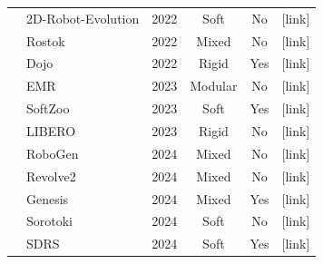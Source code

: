 \documentclass[11pt]{article}
\begin{document}
\begin{table}[htbp]
{\begin{tabular}{@{}l|l|c|c|c|c@{}}
      & 2D-Robot-Evolution & 2022 & Soft & No & {[link]} \\
      & Rostok & 2022 & Mixed & No & {[link]} \\
      & Dojo & 2022 & Rigid & Yes & {[link]} \\
      & EMR & 2023 & Modular & No & {[link]} \\
      & SoftZoo & 2023 & Soft & Yes & {[link]} \\
      & LIBERO & 2023 & Rigid & No & {[link]} \\
      & RoboGen & 2024 & Mixed & No & {[link]} \\
      & Revolve2 & 2024 & Mixed & No & {[link]} \\
      & Genesis & 2024 & Mixed & Yes & {[link]} \\
      & Sorotoki & 2024 & Soft& No & {[link]} \\
      & SDRS & 2024 & Soft & Yes & {[link]} \\
    \bottomrule
  \end{tabular}
}
\end{table}
\end{document}
